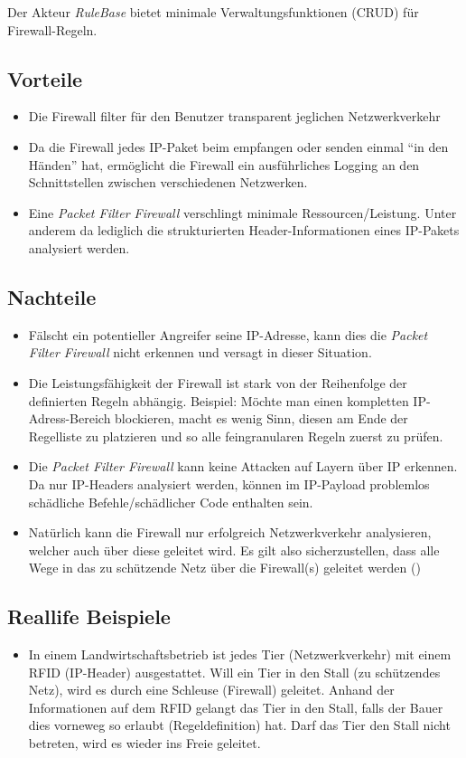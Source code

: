 Der Akteur \emph{RuleBase} bietet minimale Verwaltungsfunktionen (\gls{CRUD}) für Firewall-Regeln.


\subsection*{Vorteile}
\begin{itemize}
	\item Die Firewall filter für den Benutzer transparent jeglichen Netzwerkverkehr
	\item Da die Firewall jedes IP-Paket beim empfangen oder senden einmal ``in den Händen'' hat, ermöglicht die Firewall ein ausführliches Logging an den Schnittstellen zwischen verschiedenen Netzwerken.
	\item Eine \emph{Packet Filter Firewall} verschlingt minimale Ressourcen/Leistung. Unter anderem da lediglich die strukturierten Header-Informationen eines IP-Pakets analysiert werden.
\end{itemize}

\subsection*{Nachteile}
\begin{itemize}
	\item Fälscht ein potentieller Angreifer seine IP-Adresse, kann dies die \emph{Packet Filter Firewall} nicht erkennen und versagt in dieser Situation.
	\item Die Leistungsfähigkeit der Firewall ist stark von der Reihenfolge der definierten Regeln abhängig. Beispiel: Möchte man einen kompletten IP-Adress-Bereich blockieren, macht es wenig Sinn, diesen am Ende der Regelliste zu platzieren und so alle feingranularen Regeln zuerst zu prüfen.
	\item Die \emph{Packet Filter Firewall} kann keine Attacken auf Layern über IP erkennen. Da nur IP-Headers analysiert werden, können im IP-Payload problemlos schädliche Befehle/schädlicher Code enthalten sein.
	\item Natürlich kann die Firewall nur erfolgreich Netzwerkverkehr analysieren, welcher auch über diese geleitet wird. Es gilt also sicherzustellen, dass alle Wege in das zu schützende Netz über die Firewall(s) geleitet werden ()
\end{itemize}

\subsection*{Reallife Beispiele}
\begin{itemize}
	\item In einem Landwirtschaftsbetrieb ist jedes Tier (Netzwerkverkehr) mit einem RFID (IP-Header) ausgestattet. Will ein Tier in den Stall (zu schützendes Netz), wird es durch eine Schleuse (Firewall) geleitet. Anhand der Informationen auf dem RFID gelangt das Tier in den Stall, falls der Bauer dies vorneweg so erlaubt (Regeldefinition) hat. Darf das Tier den Stall nicht betreten, wird es wieder ins Freie geleitet.
\end{itemize}

